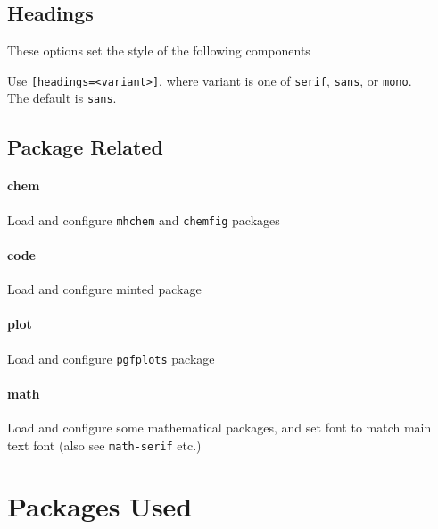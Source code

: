 \documentclass[solid,math,chem,code,plot]{bmc}
\begin{document}
\subsection{Headings}

These options set the style of the following components

Use \texttt{[headings=<variant>]}, where variant is one of  \texttt{serif}, \texttt{sans}, or \texttt{mono}.
\\The default is \texttt{sans}.

\subsection{Package Related}

\paragraph{\ttfamily chem}
Load and configure \texttt{mhchem} and \texttt{chemfig} packages

\paragraph{\ttfamily code}
Load and configure minted package

\paragraph{\ttfamily plot}
Load and configure \texttt{pgfplots} package

\paragraph{\ttfamily math}
Load and configure some mathematical packages, and set font to match main text font (also see \texttt{math-serif} etc.)

\newpage
\section{Packages Used}
\end{document}
